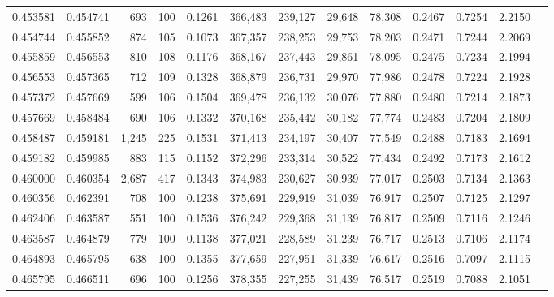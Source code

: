 \begin{tabular}{rrrrrrrrrrrrr}
0.453581 & 0.454741 &   693 & 100 &                                     0.1261 & 366,483 & 239,127 &  29,648 &  78,308 & 0.2467 & 0.7254 & 2.2150 \\
0.454744 & 0.455852 &   874 & 105 &                                     0.1073 & 367,357 & 238,253 &  29,753 &  78,203 & 0.2471 & 0.7244 & 2.2069 \\
0.455859 & 0.456553 &   810 & 108 &                                     0.1176 & 368,167 & 237,443 &  29,861 &  78,095 & 0.2475 & 0.7234 & 2.1994 \\
0.456553 & 0.457365 &   712 & 109 &                                     0.1328 & 368,879 & 236,731 &  29,970 &  77,986 & 0.2478 & 0.7224 & 2.1928 \\
0.457372 & 0.457669 &   599 & 106 &                                     0.1504 & 369,478 & 236,132 &  30,076 &  77,880 & 0.2480 & 0.7214 & 2.1873 \\
0.457669 & 0.458484 &   690 & 106 &                                     0.1332 & 370,168 & 235,442 &  30,182 &  77,774 & 0.2483 & 0.7204 & 2.1809 \\
0.458487 & 0.459181 & 1,245 & 225 &                                     0.1531 & 371,413 & 234,197 &  30,407 &  77,549 & 0.2488 & 0.7183 & 2.1694 \\
0.459182 & 0.459985 &   883 & 115 &                                     0.1152 & 372,296 & 233,314 &  30,522 &  77,434 & 0.2492 & 0.7173 & 2.1612 \\
0.460000 & 0.460354 & 2,687 & 417 &                                     0.1343 & 374,983 & 230,627 &  30,939 &  77,017 & 0.2503 & 0.7134 & 2.1363 \\
0.460356 & 0.462391 &   708 & 100 &                                     0.1238 & 375,691 & 229,919 &  31,039 &  76,917 & 0.2507 & 0.7125 & 2.1297 \\
0.462406 & 0.463587 &   551 & 100 &                                     0.1536 & 376,242 & 229,368 &  31,139 &  76,817 & 0.2509 & 0.7116 & 2.1246 \\
0.463587 & 0.464879 &   779 & 100 &                                     0.1138 & 377,021 & 228,589 &  31,239 &  76,717 & 0.2513 & 0.7106 & 2.1174 \\
0.464893 & 0.465795 &   638 & 100 &                                     0.1355 & 377,659 & 227,951 &  31,339 &  76,617 & 0.2516 & 0.7097 & 2.1115 \\
0.465795 & 0.466511 &   696 & 100 &                                     0.1256 & 378,355 & 227,255 &  31,439 &  76,517 & 0.2519 & 0.7088 & 2.1051 \\

\end{tabular}

